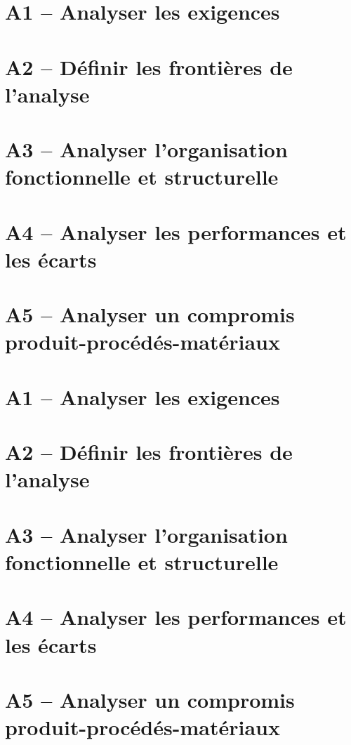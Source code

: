 \proffalse
\section{A1 -- Analyser les exigences}
\begin{multicols}{2}
\end{multicols}

\section{A2 -- Définir les frontières de l'analyse}
\begin{multicols}{2}
\end{multicols}

\section{A3 -- Analyser l'organisation fonctionnelle et structurelle}

\begin{multicols}{2}

\end{multicols}

\begin{multicols}{2}

\end{multicols}

\section{A4 -- Analyser les performances et les écarts}
\begin{multicols}{2}
\end{multicols}

\section{A5 -- Analyser un compromis produit-procédés-matériaux}
\begin{multicols}{2}
\end{multicols}


\proftrue
\newpage
\section{A1 -- Analyser les exigences}

\section{A2 -- Définir les frontières de l'analyse}

\section{A3 -- Analyser l'organisation fonctionnelle et structurelle}



\section{A4 -- Analyser les performances et les écarts}
\section{A5 -- Analyser un compromis produit-procédés-matériaux}
